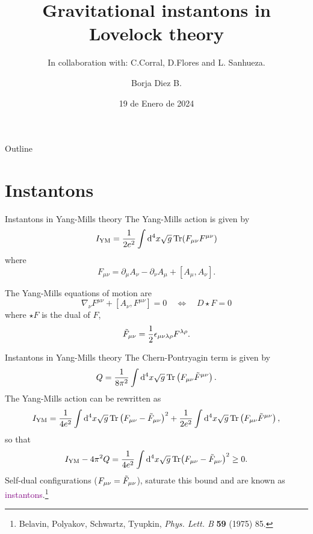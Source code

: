 \documentclass[aspectratio=169,xcolor=dvipsnames]{beamer}
\title[short title]{Gravitational instantons in Lovelock theory} %
\subtitle{In collaboration with: C.Corral, D.Flores and L. Sanhueza.}
\author[Pin-Yen] {Borja Diez B.}
\institute[NTU] %
{
    Instituto de Ciencias Exactas y Naturales \\
    Facultad de Ciencias\\
    Universidad Arturo Prat %
}
\date{19 de Enero de 2024} %
\begin{document}
\begin{frame}
    \titlepage
\end{frame}

\begin{frame}{Outline}
    \tableofcontents
\end{frame}

\section{Instantons}\justifying
\begin{frame}{Instantons in Yang-Mills theory}
The Yang-Mills action is given by
\begin{equation*}
    I_{\text{YM}}=\frac{1}{2 e^2}\int\dd^4x\sqrt{g}\Tr (F_{\mu\nu}F^{\mu\nu})
\end{equation*}
where
\begin{equation*}
    F_{\mu\nu}=\partial_\mu A_\nu-\partial_\nu A_\mu +[A_\mu,A_\nu].
\end{equation*}

The Yang-Mills equations of motion are
\begin{equation*}
    \nabla_\nu F^{\mu\nu}+[A_\nu,F^{\mu\nu}]=0 \quad \Leftrightarrow \quad D\star F=0
\end{equation*}
where $\star F$ is the dual of $F$,
\begin{equation*}
        \Tilde{F}_{\mu\nu}=\frac{1}{2}\epsilon_{\mu\nu\lambda\rho}F^{\lambda\rho}.
    \end{equation*}
\end{frame}

\begin{frame}{Instantons in Yang-Mills theory}\justifying
    The Chern-Pontryagin term is given by
    \begin{equation*}
        Q=\frac{1}{8\pi^2}\int\dd^4x\sqrt{g}\Tr\left(F_{\mu\nu}\Tilde{F}^{\mu\nu}\right).
    \end{equation*}
    The Yang-Mills action can be rewritten as
    \begin{align*}
        I_{\text{YM}}=\frac{1}{4e^2}\int\dd^4x\sqrt{g}\Tr \left(F_{\mu\nu}-\Tilde{F}_{\mu\nu}\right)^2+\frac{1}{2e^2}\int\dd^4x\sqrt{g}\Tr\left(F_{\mu\nu}\Tilde{F}^{\mu\nu}\right),
    \end{align*}
    so that
    \begin{equation*}
        I_{\text{{YM}}}-4\pi^2 Q=\frac{1}{4e^2}\int\dd^4x\sqrt{g}\Tr(F_{\mu\nu}-\Tilde{F}_{\mu\nu})^2\geq 0.
    \end{equation*}
    Self-dual configurations ($F_{\mu\nu}=\Tilde{F}_{\mu\nu}$), saturate this bound and are known as \textcolor{purple}{instantons}.\footnote{Belavin, Polyakov, Schwartz, Tyupkin, \textit{Phys. Lett. B} \textbf{59} (1975) 85.}
\end{frame}
\end{document}
